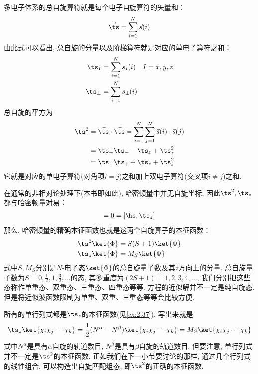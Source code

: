多电子体系的总自旋算符就是每个电子自旋算符的矢量和：
\begin{align}
\vec{\ts} = \sum_{i=1}^{N}\vec{s}(i)
\end{align}
由此式可以看出, 
总自旋的分量以及阶梯算符就是对应的单电子算符之和：
\begin{subequations}
	\begin{align}
	\ts_I   & = \sum_{i=1}^{N}s_I(i)\quad I=x,y,z\\
	\ts_\pm & = \sum_{i=1}^{N}s_\pm(i) 
	\end{align}
\end{subequations}
总自旋的平方为
\begin{align}
\ts^2 & = \vec{\ts}\cdot\vec{\ts} = \sum_{i=1}^{N}\sum_{j=1}^{N} \vec{s}(i)\cdot\vec{s}(j) \notag \\
      & = \ts_+\ts_- - \ts_z + \ts^2_z\notag\\
      & = \ts_-\ts_+ + \ts_z + \ts^2_z
\end{align}
它就是对应的单电子算符(对角项$i=j$)之和加上双电子算符(交叉项$i\neq j$)之和.


在通常的非相对论处理下(本书即如此), 
哈密顿量中并无自旋坐标, 
因此$\ts^2,\ts_z$都与哈密顿量对易：
\begin{align}
[\hs,\ts^2] = 0 = [\hs,\ts_z]
\end{align} 
那么, 
哈密顿量的精确本征函数也就是这两个自旋算子的本征函数：
\begin{subequations}
	\begin{align}
	\ts^2\ket{\Phi} & = S(S+1)\ket{\Phi}\\
	\ts_z\ket{\Phi} & = M_S\ket{\Phi}
	\end{align}
\end{subequations}
式中$S,M_S$分别是$N$-电子态$\ket{\Phi}$的总自旋量子数及其$z$方向上的分量. 
总自旋量子数为$S=0,\frac{1}{2},1,\frac{3}{2},\ldots$的态, 
其多重度为$(2S+1)=1,2,3,4,\ldots$, 
我们分别把这些态称作单重态、双重态、三重态、四重态等等. 
\sch 方程的近似解并不一定是纯自旋态. 
但是将近似波函数限制为单重、双重、三重态等等会比较方便.


所有的单行列式都是$\ts_z$的本征函数(见\autoref{ex:2.37}). 
写出来就是
\begin{align}
\label{eq:2.254}
\ts_z\ket{\chi_i\chi_j\cdots\chi_k} = \frac{1}{2}(N^\alpha - N^\beta)\ket{\chi_i\chi_j\cdots\chi_k} = M_S\ket{\chi_i\chi_j\cdots\chi_k}
\end{align}
式中$N^\alpha$是具有$\alpha$自旋的轨道数目, 
$N^\beta$是具有$\beta$自旋的轨道数目. 
但要注意, 
单行列式并不一定是$\ts^2$的本征函数. 
正如我们在下一小节要讨论的那样, 
通过几个行列式的线性组合, 
可以构造出自旋匹配组态, 
即$\ts^2$的正确的本征函数.

